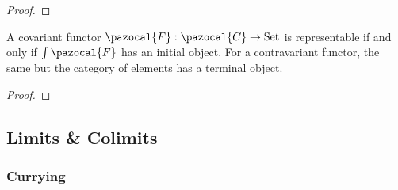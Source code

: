 \begin{proof}
    
\end{proof}
\begin{proposition}
    A covariant functor $\pazocal{F} : \pazocal{C}\rightarrow \mathrm{Set}$ is representable if and only if $\int \pazocal{F}$ has an initial object. For a contravariant functor, the same but the category of elements has a terminal object.  
\end{proposition}
\begin{proof}
    
\end{proof}
\subsection{Limits \& Colimits}

\subsubsection{Currying}